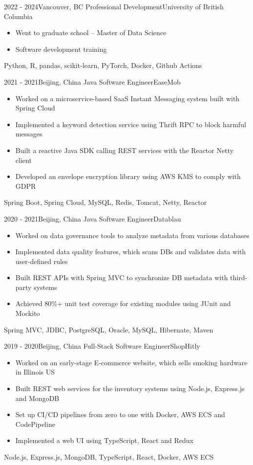 \begin{experiences}

\experience
{2022 - 2024}{Vancouver, BC}
{Professional Development}{University of British Columbia}
{
    \begin{itemize}
    \item Went to graduate school -- Master of Data Science
    \item Software development training
    \end{itemize}
}
{Python, R, pandas, scikit-learn, PyTorch, Docker, Github Actions}

\emptySeparator

\experience
{2021 - 2021}{Beijing, China}
{Java Software Engineer}{EaseMob}
{
    \begin{itemize}
    \item Worked on a microservice-based SaaS Instant Messaging system built with Spring Cloud
    \item Implemented a keyword detection service using Thrift RPC to block harmful messages
    \item Built a reactive Java SDK calling REST services with the Reactor Netty client
    \item Developed an envelope encryption library using AWS KMS to comply with GDPR
    \end{itemize}
}
{Spring Boot, Spring Cloud, MySQL, Redis, Tomcat, Netty, Reactor}

\emptySeparator

\experience
{2020 - 2021}{Beijing, China}
{Java Software Engineer}{Datablau}
{
    \begin{itemize}
    \item Worked on data governance tools to analyze metadata from various databases
    \item Implemented data quality features, which scans DBs and validates data with user-defined rules
    \item Built REST APIs with Spring MVC to synchronize DB metadata with third-party systems
    \item Achieved 80\%+ unit test coverage for existing modules using JUnit and Mockito
    \end{itemize}
}
{Spring MVC, JDBC, PostgreSQL, Oracle, MySQL, Hibernate, Maven}

\emptySeparator

\experience
{2019 - 2020}{Beijing, China}
{Full-Stack Software Engineer}{ShopHitly}
{
    \begin{itemize}
    \item Worked on an early-stage E-commerce website, which sells smoking hardware in Illinois US
    \item Built REST web services for the inventory systems using Node.js, Express.js and MongoDB
    \item Set up CI/CD pipelines from zero to one with Docker, AWS ECS and CodePipeline
    \item Implemented a web UI using TypeScript, React and Redux
    \end{itemize}
}
{Node.js, Express.js, MongoDB, TypeScript, React, Docker, AWS ECS}


\end{experiences}
